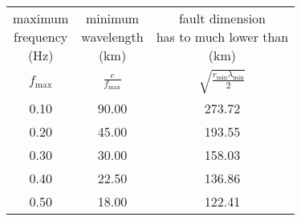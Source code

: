 \begin{tabular}{ccc}
\makecell{maximum \\ frequency \\ (Hz)} & \makecell{minimum  \\ wavelength \\(km)} & \makecell{fault dimension \\ has to much lower than \\(km)}\\
$f_{\text{max}}$ & $\frac{c}{f_{\text{max}}}$ & $\sqrt{\frac{r_{\text{min}}\lambda_{\text{min}}}{2}}$\\
0.10 & 90.00 & 273.72\\
0.20 & 45.00 & 193.55\\
0.30 & 30.00 & 158.03\\
0.40 & 22.50 & 136.86\\
0.50 & 18.00 & 122.41\\
\end{tabular}
